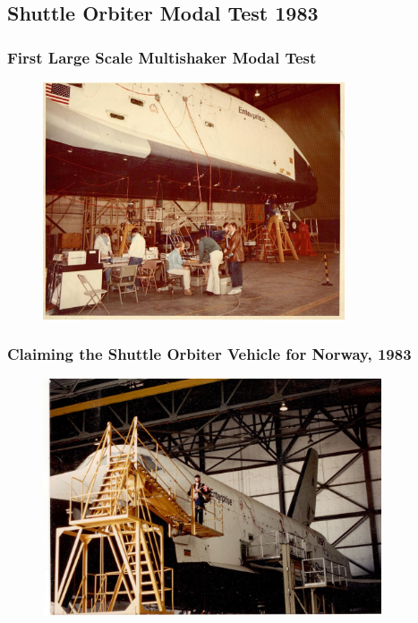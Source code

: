 \documentclass[aspectratio=169,10pt]{beamer} \mode<presentation>
\begin{document}
\subsection{Shuttle Orbiter Modal Test 1983}

\begin{frame}
  \frametitle{First Large Scale Multishaker Modal Test}
  \begin{figure}
    \centering
    \includegraphics[width=0.65\linewidth,height=7cm]{SDRC-shuttle-1983}
  \end{figure}
\end{frame}

\begin{frame}
  \frametitle{Claiming the Shuttle Orbiter Vehicle for Norway, 1983}
  \begin{figure}
    \centering
    \includegraphics[width=0.65\linewidth,height=7cm]{Shuttle-1983}
  \end{figure}
\end{frame}


\end{document}

